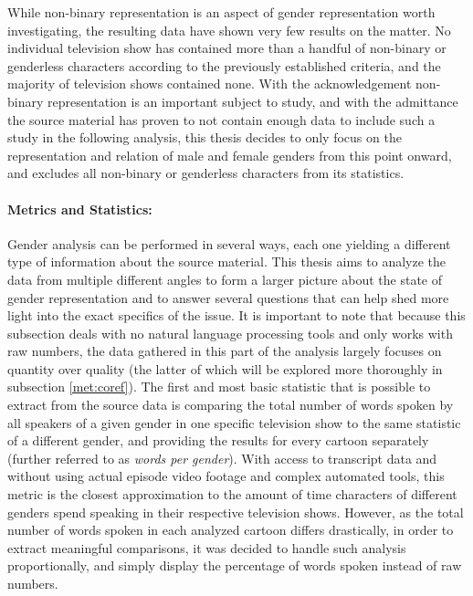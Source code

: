 \documentclass[a4paper, 11pt]{article}
\begin{document}
While non-binary representation is an aspect of gender representation worth investigating, the resulting data have shown very few results on the matter. No individual television show has contained more than a handful of non-binary or genderless characters according to the previously established criteria, and the majority of television shows contained none. With the acknowledgement non-binary representation is an important subject to study, and with the admittance the source material has proven to not contain enough data to include such a study in the following analysis, this thesis decides to only focus on the representation and relation of male and female genders from this point onward, and excludes all non-binary or genderless characters from its statistics.

\paragraph{Metrics and Statistics:}
Gender analysis can be performed in several ways, each one yielding a different type of information about the source material. This thesis aims to analyze the data from multiple different angles to form a larger picture about the state of gender representation and to answer several questions that can help shed more light into the exact specifics of the issue. It is important to note that because this subsection deals with no natural language processing tools and only works with raw numbers, the data gathered in this part of the analysis largely focuses on quantity over quality (the latter of which will be explored more thoroughly in subsection \ref{met:coref}). The first and most basic statistic that is possible to extract from the source data is comparing the total number of words spoken by all speakers of a given gender in one specific television show to the same statistic of a different gender, and providing the results for every cartoon separately (further referred to as \textit{words per gender}). With access to transcript data and without using actual episode video footage and complex automated tools, this metric is the closest approximation to the amount of time characters of different genders spend speaking in their respective television shows. However, as the total number of words spoken in each analyzed cartoon differs drastically, in order to extract meaningful comparisons, it was decided to handle such analysis proportionally, and simply display the percentage of words spoken instead of raw numbers.
\end{document}
